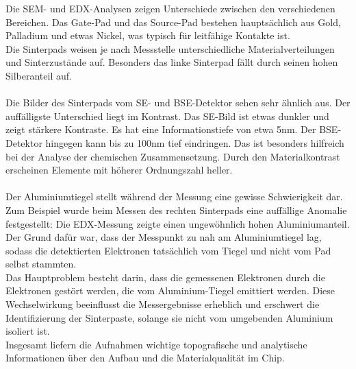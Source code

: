 Die SEM- und EDX-Analysen zeigen Unterschiede zwischen den verschiedenen Bereichen. Das Gate-Pad und das Source-Pad bestehen hauptsächlich aus Gold, Palladium und etwas Nickel, was typisch für leitfähige Kontakte ist.\\ 
Die Sinterpads weisen je nach Messstelle unterschiedliche Materialverteilungen und Sinterzustände auf. Besonders das linke Sinterpad fällt durch seinen hohen Silberanteil auf.\\\\
Die Bilder des Sinterpads vom SE- und BSE-Detektor sehen sehr ähnlich aus. 
Der auffälligste Unterschied liegt im Kontrast. 
Das SE-Bild ist etwas dunkler und zeigt stärkere Kontraste. 
Es hat eine Informationstiefe von etwa 5nm. Der BSE-Detektor hingegen kann bis zu 100nm tief eindringen. 
Das ist besonders hilfreich bei der Analyse der chemischen Zusammensetzung. Durch den Materialkontrast erscheinen Elemente mit höherer Ordnungszahl heller. \\ \\
Der Aluminiumtiegel stellt während der Messung eine gewisse Schwierigkeit dar. 
Zum Beispiel wurde beim Messen des rechten Sinterpads eine auffällige Anomalie festgestellt: Die EDX-Messung zeigte einen ungewöhnlich hohen Aluminiumanteil. Der Grund dafür war, dass der Messpunkt zu nah am Aluminiumtiegel lag, sodass die detektierten Elektronen tatsächlich vom Tiegel und nicht vom Pad selbst stammten.\\
Das Hauptproblem besteht darin, dass die gemessenen Elektronen durch die Elektronen gestört werden, die vom Aluminium-Tiegel emittiert werden. Diese Wechselwirkung beeinflusst die Messergebnisse erheblich und erschwert die Identifizierung der Sinterpaste, solange sie nicht vom umgebenden Aluminium isoliert ist.\\
Insgesamt liefern die Aufnahmen wichtige topografische und analytische Informationen über den Aufbau und die Materialqualität im Chip.
